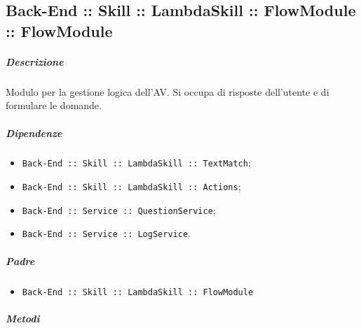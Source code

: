 \documentclass[../ManualeSviluppatore_v2.0.0.tex]{subfiles}
\begin{document}
\subsection{Back-End :: Skill :: LambdaSkill :: FlowModule :: FlowModule}
\subparagraph{Descrizione} Modulo per la gestione logica dell'AV. Si occupa di risposte dell'utente e di formulare le domande.
\subparagraph{Dipendenze}
\begin{itemize}
	\item \texttt{Back-End :: Skill :: LambdaSkill :: TextMatch};
	\item \texttt{Back-End :: Skill :: LambdaSkill :: Actions};
	\item \texttt{Back-End :: Service :: QuestionService};
	\item \texttt{Back-End :: Service :: LogService}.
\end{itemize}
\subparagraph{Padre}
\begin{itemize}
	\item \texttt{Back-End :: Skill :: LambdaSkill :: FlowModule}
\end{itemize}
\subparagraph{Metodi}
\end{document}
